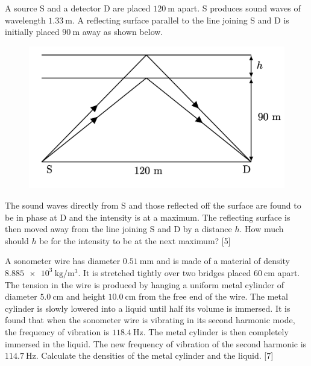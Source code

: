 \begin{problem}
    \begin{subproblem}
        A source $\mathrm{S}$ and a detector $\mathrm{D}$ are placed $\qty{120}{\m}$ apart. S produces sound waves of wavelength $\qty{1.33}{\m}$. A reflecting surface parallel to the line joining S and D is initially placed $\qty{90}{\m}$ away as shown below.
        
        \begin{figure}[h]
	        \centering
        	\includegraphics[width=0.5\linewidth]{spho_book_TYS_images/2019q7.png}
        	\label{2019q7}
        \end{figure}
        \noindent The sound waves directly from $\mathrm{S}$ and those reflected off the surface are found to be in phase at $\mathrm{D}$ and the intensity is at a maximum. The reflecting surface is then moved away from the line joining S and D by a distance $h$. How much should $h$ be for the intensity to be at the next maximum?
    \hfill{[5]}\end{subproblem}
    \begin{subproblem}
        A sonometer wire has diameter $\qty{0.51}{\mm}$ and is made of a material of density $\qty{8.885e3}{\kg\per\cubic\m}$. It is stretched tightly over two bridges placed $\qty{60}{\cm}$ apart. The tension in the wire is produced by hanging a uniform metal cylinder of diameter $\qty{5.0}{\cm}$ and height $\qty{10.0}{\cm}$ from the free end of the wire. The metal cylinder is slowly lowered into a liquid until half its volume is immersed. It is found that when the sonometer wire is vibrating in its second harmonic mode, the frequency of vibration is $\qty{118.4}{\Hz}$. The metal cylinder is then completely immersed in the liquid. The new frequency of vibration of the second harmonic is $\qty{114.7}{\Hz}$. Calculate the densities of the metal cylinder and the liquid.
    \hfill{[7]}\end{subproblem}
\end{problem}

